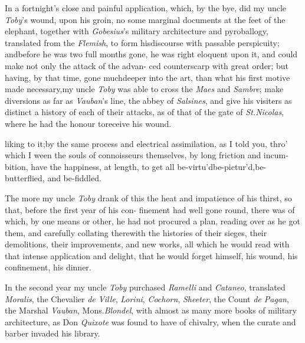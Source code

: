 \documentclass{article}
\begin{document}
In a fortnight’s close and painful application, which, by
the bye, did my uncle \textit{Toby}’s wound, upon his groin, no
some marginal documents at the feet of the elephant, together with \textit{Gobesius}’s
mi\-litary architecture and pyroballogy,\break
translated from the
\textit{Flemish}, to form his\break discourse with passable perspicuity;
and\break before he was two full months gone,\tsk\break
he was right eloquent upon it, and could make not only the
attack of the advan-
ced counterscarp with great order;\tsh\break 
but having, by that time, gone much\break deeper into
the art, than what his first motive made necessary,\tsk my uncle \textit{Toby} was able
to cross the \textit{Maes} and \textit{Sambre}; make diversions as far as
\textit{Vauban}’s line, the abbey of \textit{Salsines}, \etc and give his visiters
as distinct a history of each of their attacks, as of that of the gate of
\textit{St.\@ Nicolas}, where he had the honour to\break receive his wound.

\noindent
{}
liking to it;\tsk by the same process and\break
electrical assimilation, as I told you, thro’\break
which I ween the souls of connoisseurs\break
themselves, by long friction and incum-\break
bition, have the happiness, at length, to get all
be-virtu’d\tsk be-pictur’d,\tsk be-butterflied, and
be-fiddled.

The more my uncle \textit{Toby} drank of this\break
{}
the heat and impatience of his thirst,\break
so that, before the first year of his con-\break
finement had well gone round, there was\break
{}
of which, by one means or other, he had not
procured a plan, reading over as he got them, and carefully
collating therewith the histories of their sieges, their
demolitions, their improvements, and new works, all which he
would read with that intense application and delight, that he
would forget himself, his wound, his confinement, his dinner.

In the second year my uncle \textit{Toby} purchased \textit{Ramelli}
and \textit{Cataneo}, translated
\textit{Moralis}, the Chevalier \textit{de Ville}, \textit{Lorini},\break 
\textit{Cochorn}, \textit{Sheeter}, the Count \textit{de Pagan}, 
the Marshal \textit{Vauban}, Mons.\@ \textit{Blondel}, with\break
almost as many more books of military architecture, as Don
\textit{Quixote} was found to have of chivalry, when the
curate and\break
barber invaded his library.
\end{document}
